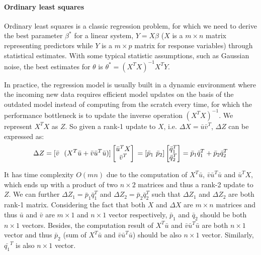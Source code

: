 \paragraph{Ordinary least squares}
Ordinary least squares is a classic regression problem, for which we need to derive the best parameter $\beta^*$ for a linear system, $Y = X\beta$ ($X$ is a $m \times n$ matrix representing predictors while $Y$ is a $m \times p$ matrix for response variables) through statistical estimates. With some typical statistic assumptions, such as Gaussian noise, the best estimates for $\theta$ is $\theta^* = (X^TX)^{-1}X^TY$.

In practice, the regression model is usually built in a dynamic environment where the incoming new data requires efficient model updates on the basis of the outdated model instead of computing from the scratch every time, for which the performance bottleneck is to update the inverse operation $(X^TX)^{-1}$. We represent $X^TX$ as $Z$. So given a rank-1 update to $X$, i.e. $\Delta X = \bar{u}\bar{v}^T$, $\Delta Z$ can be expressed as:
\begin{equation}
    \Delta Z = [\bar{v}\ \ (X^T\bar{u} + \bar{v}\bar{u}^T\bar{u})]\begin{bmatrix}
    \bar{u}^T X  \\
    \bar{v}^T  
\end{bmatrix}\\
=[\bar{p}_1\ \bar{p}_2]\begin{bmatrix}
    \bar{q}^T_1  \\
    \bar{q}^T_2  
\end{bmatrix}=\bar{p}_1\bar{q}_1^T + \bar{p}_2\bar{q}_2^T
\end{equation}

It has time complexity $O(mn)$ due to the computation of $X^T\bar{u}$, $\bar{v}\bar{u}^T\bar{u}$ and $\bar{u}^TX$, which ends up with a product of two $n\times 2$ matrices and thus a rank-2 update to $Z$. We can further $\Delta Z_1 = \bar{p}_1\bar{q}_1^T$ and $\Delta Z_2 = \bar{p}_2\bar{q}_2^T$ such that $\Delta Z_1$ and $\Delta Z_2$ are both rank-1 matrix. Considering the fact that both $X$ and $\Delta X$ are $m \times n$ matrices and thus $\bar{u}$ and $\bar{v}$ are $m \times 1$ and $n \times 1$ vector respectively, $\bar{p}_1$ and $\bar{q}_2$ should be both $n \times 1$ vectors. Besides, the computation result of $X^T\bar{u}$ and $\bar{v}\bar{u}^T\bar{u}$ are both $n \times 1$ vector and thus $\bar{p}_2$ (sum of $X^T\bar{u}$ and $\bar{v}\bar{u}^T\bar{u}$) should be also $n \times 1$ vector. Similarly, $\bar{q_1}^T$ is also $n \times 1$ vector.

